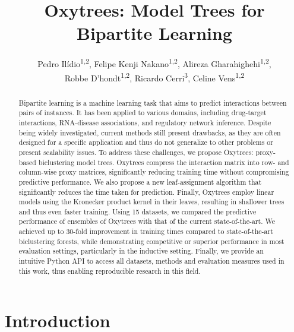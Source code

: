 \documentclass[letterpaper]{article}
\title{Oxytrees: Model Trees for Bipartite Learning}
\author{
    Pedro Ilídio\textsuperscript{\rm 1,\rm 2},
    Felipe Kenji Nakano\textsuperscript{\rm 1,\rm 2},
    Alireza Gharahighehi\textsuperscript{\rm 1,\rm 2},\\
    Robbe D'hondt\textsuperscript{\rm 1,\rm 2},
    Ricardo Cerri\textsuperscript{\rm 3},
    Celine Vens\textsuperscript{\rm 1,\rm 2}
}
\begin{document}
\maketitle

\begin{abstract}
Bipartite learning is a machine learning task that aims to predict interactions between pairs of instances. It has been applied to various domains, including drug-target interactions, RNA-disease associations, and regulatory network inference. Despite being widely investigated, current methods still present drawbacks, as they are often designed for a specific application and thus do not generalize to other problems or present scalability issues.
To address these challenges, we propose Oxytrees: proxy-based biclustering model trees. Oxytrees compress the interaction matrix into row- and column-wise proxy matrices, significantly reducing training time without compromising predictive performance.
We also propose a new leaf-assignment algorithm that significantly reduces the time taken for prediction.
Finally, Oxytrees employ linear models using the Kronecker product kernel in their leaves, resulting in shallower trees and thus even faster training. Using 15 datasets, we compared the predictive performance of ensembles of Oxytrees with that of the current state-of-the-art.
We achieved up to 30-fold improvement in training times compared to state-of-the-art biclustering forests, while demonstrating competitive or superior performance in most evaluation settings, particularly in the inductive setting.
Finally, we provide an intuitive Python API to access all datasets, methods and evaluation measures used in this work, thus enabling reproducible research in this field.
\end{abstract}

\begin{links}
\end{links}


\section{Introduction}
\label{sec:introduction}
\end{document}

